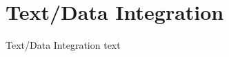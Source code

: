 
\section{Text/Data Integration}\fbeg{}\begin{frame}{}


{\fontsize{20}{23}\selectfont

Text/Data Integration text

}

\end{frame}

